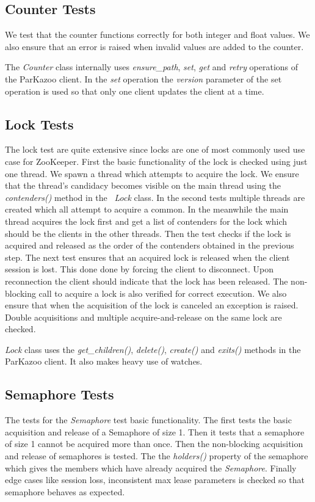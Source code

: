 	\subsection{Counter Tests}
	
	We test that the counter functions correctly for both integer and float values. We also ensure that an error is raised when invalid values are added to the counter.
	
	The \textit{Counter} class internally uses \textit{ensure\_path}, \textit{set}, \textit{get} and \textit{retry} operations of the ParKazoo client. In the \textit{set} operation the \textit{version} parameter of the set operation is used so that only one client updates the client at a time.
	
	\subsection{Lock Tests}
	The lock test are quite extensive since locks are one of most commonly used use case for ZooKeeper. First the basic functionality of the lock is checked using just one thread. We spawn a thread which attempts to acquire the lock. We ensure that the thread's candidacy becomes visible on the main thread using the \textit{contenders()} method in the ~\textit{Lock} class. In the second tests multiple threads are created which all attempt to acquire a common. In the meanwhile the main thread acquires the lock first and get a list of contenders for the lock which should be the clients in the other threads. Then the test checks if the lock is acquired and released as the order of the contenders obtained in the previous step. The next test ensures that an acquired lock is released when the client session is lost. This done done by forcing the client to disconnect. Upon reconnection the client should indicate that the lock has been released. The non-blocking call to acquire a lock is also verified for correct execution. We also ensure that when the acquisition of the lock is canceled an exception is raised. Double acquisitions and multiple acquire-and-release on the same lock are checked.
	
	\textit{Lock} class uses the \textit{get\_children()}, \textit{delete()}, \textit{create()} and \textit{exits()} methods in the ParKazoo client. It also makes heavy use of watches.
	
	\subsection{Semaphore Tests}
	The tests for the \textit{Semaphore} test basic functionality. The first tests the basic acquisition and release of a Semaphore of size 1. Then it tests that a semaphore of size 1 cannot be acquired more than once. Then the non-blocking acquisition and release of semaphores is tested. The the \textit{holders()} property of the semaphore which gives the members which have already acquired the \textit{Semaphore}. Finally edge cases like session loss, inconsistent max lease parameters is checked so that semaphore behaves as expected.
		

